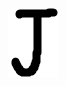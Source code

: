 \documentclass[russian,utf8,emptystyle]{eskdtext}
\begin{document}
\begin{figure}[!htb]
\includegraphics[width=\linewidth]{../data/learn/j/001}
\endminipage\hfill
{}

\end{figure}
\end{document}
